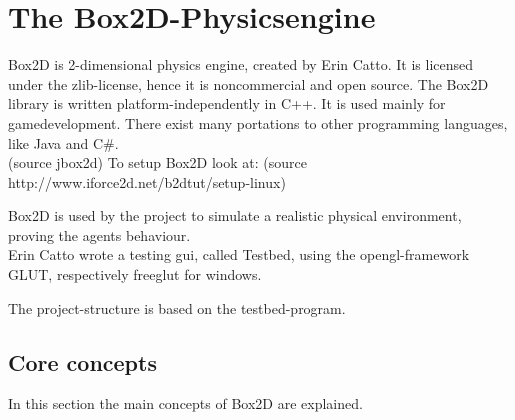 \documentclass[10pt,a4paper,DIV=11]{scrreprt}
\begin{document}









\chapter{The Box2D-Physicsengine}
Box2D is 2-dimensional physics engine, created by Erin Catto. It is licensed under the zlib-license, hence it is noncommercial and open source. The Box2D library is written platform-independently in C++. It is used mainly for gamedevelopment. There exist many portations to other programming languages, like Java and C\#. \\
(source jbox2d)
To setup Box2D look at:
(source http://www.iforce2d.net/b2dtut/setup-linux)

Box2D is used by the project to simulate a realistic physical environment, proving the agents behaviour. \\

Erin Catto wrote a testing gui, called Testbed, using the opengl-framework GLUT, respectively freeglut for windows.

The project-structure is based on the testbed-program.


\section{Core concepts}
In this section the main concepts of Box2D are explained.
\end{document}
